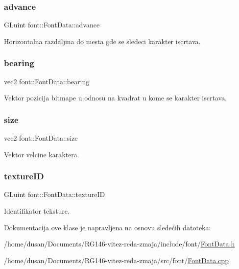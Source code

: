 \subsubsection{\texorpdfstring{advance}{advance}}
{\footnotesize\ttfamily G\+Luint font\+::\+Font\+Data\+::advance}



Horizontalna razdaljina do mesta gde se sledeci karakter iscrtava. 

\mbox{\label{classfont_1_1FontData_a08a463faed8b16ed9fd55f94228a44d4}} 
\subsubsection{\texorpdfstring{bearing}{bearing}}
{\footnotesize\ttfamily vec2 font\+::\+Font\+Data\+::bearing}



Vektor pozicija bitmape u odnosu na kvadrat u kome se karakter iscrtava. 

\mbox{\label{classfont_1_1FontData_a783ccdb54f0b3319c31c31bd8acf6111}} 
\subsubsection{\texorpdfstring{size}{size}}
{\footnotesize\ttfamily vec2 font\+::\+Font\+Data\+::size}



Vektor velcine karaktera. 

\mbox{\label{classfont_1_1FontData_ad91fcb854ec0a18c84d315c5c70f0eb5}} 
\subsubsection{\texorpdfstring{texture\+ID}{textureID}}
{\footnotesize\ttfamily G\+Luint font\+::\+Font\+Data\+::texture\+ID}



Identifikator teksture. 



Dokumentacija ove klase je napravljena na osnovu sledećih datoteka\+:\begin{DoxyCompactItemize}
\item 
/home/dusan/\+Documents/\+R\+G146-\/vitez-\/reda-\/zmaja/include/font/\hyperlink{FontData_8h}{Font\+Data.\+h}\item 
/home/dusan/\+Documents/\+R\+G146-\/vitez-\/reda-\/zmaja/src/font/\hyperlink{FontData_8cpp}{Font\+Data.\+cpp}\end{DoxyCompactItemize}
